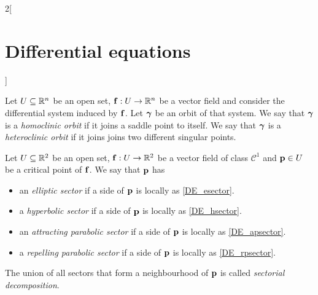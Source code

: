 \documentclass[../../../main_math.tex]{subfiles}
\begin{document}
\begin{multicols}{2}[\section{Differential equations}]
\begin{definition}
    Let $U\subseteq \mathbb{R}^n$ be an open set, $\boldsymbol{\mathrm{f}}:U\rightarrow\mathbb{R}^n$ be a vector field and consider the differential system induced by $\boldsymbol{\mathrm{f}}$. Let $\boldsymbol{\mathrm{\gamma}}$ be an orbit of that system. We say that $\boldsymbol{\mathrm{\gamma}}$ is a \emph{homoclinic orbit} if it joins a saddle point to itself. We say that $\boldsymbol{\mathrm{\gamma}}$ is a \emph{heteroclinic orbit} if it joins joins two different singular points.
  \end{definition}
  \begin{center}
    \begin{minipage}{\linewidth}
      \centering
      
    \end{minipage}
  \end{center}
  \begin{definition}
    Let $U\subseteq \mathbb{R}^2$ be an open set, $\boldsymbol{\mathrm{f}}:U\rightarrow\mathbb{R}^2$ be a vector field of class $\mathcal{C}^1$ and $\boldsymbol{\mathrm{p}}\in U$ be a critical point of $\boldsymbol{\mathrm{f}}$. We say that $\boldsymbol{\mathrm{p}}$ has
    \begin{itemize}
      \item an \emph{elliptic sector} if a side of $\boldsymbol{\mathrm{p}}$ is locally as \cref{DE_esector}.
      \item a \emph{hyperbolic sector} if a side of $\boldsymbol{\mathrm{p}}$ is locally as \cref{DE_hsector}.
      \item  an \emph{attracting parabolic sector} if a side of $\boldsymbol{\mathrm{p}}$ is locally as \cref{DE_apsector}.
      \item a \emph{repelling parabolic sector} if a side of $\boldsymbol{\mathrm{p}}$ is locally as \cref{DE_rpsector}.
    \end{itemize}
    The union of all sectors that form a neighbourhood of $\boldsymbol{\mathrm{p}}$ is called \emph{sectorial decomposition}.
    \begin{center}
      \begin{minipage}[b]{0.475\linewidth}
        \centering
        
        \label{DE_esector}
      \end{minipage}\hfill
      \begin{minipage}[b]{0.475\linewidth}
        \centering
        
        \label{DE_hsector}
      \end{minipage}

\end{center}
\end{definition}
\end{multicols}
\end{document}

